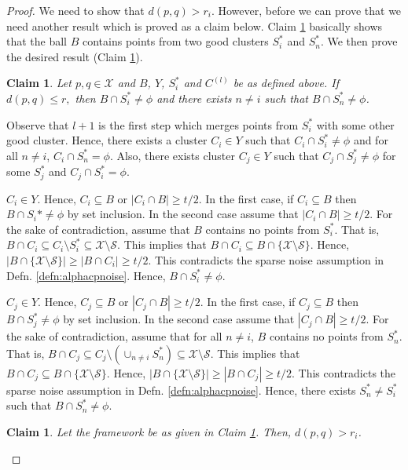 \documentclass[anon,12pt]{colt2016} %
\newtheorem{claim}[theorem]{Claim}
\newcommand{\mc}{\mathcal}
\begin{document}
\begin{proof}
We need to show that $d(p, q) > r_i$. However, before we can prove that we need another result which is proved as a claim below. Claim \ref{claim:fromBothCluster} basically shows that the ball $B$ contains points from two good clusters $S_i^*$ and $S_n^*$. We then prove the desired result (Claim \ref{claim:maxrirj}).
\begin{claim}
\label{claim:fromBothCluster}
Let $p, q \in \mc X$ and $B$, $Y$, $S_i^*$ and $C^{(l)}$ be as defined above. If $d(p, q) \le r,$ then $B \cap S_i^* \neq \phi$ and there exists $n \neq i$ such that $B \cap S_n^* \neq \phi$.
\end{claim}
\vspace{-0.1in} Observe that $l+1$ is the first step which merges points from $S_i^*$ with some other good cluster. Hence, there exists a cluster $C_i \in Y$ such that $C_i\cap S_i^*  \neq \phi$ and for all $n \neq i$, $C_i \cap S_n^* = \phi$. Also, there exists cluster $C_j \in Y$ such that $C_j \cap S_j^* \neq \phi$ for some $S_j^*$ and $C_j \cap S_i^* = \phi$.

$C_i \in Y$. Hence, $C_i \subseteq B$ or $|C_i \cap B| \ge t/2$. In the first case, if $C_i \subseteq B$ then $B \cap S_i* \neq \phi$ by set inclusion. In the second case assume that $|C_i \cap B| \ge t/2$. For the sake of contradiction, assume that $B$ contains no points from $S_i^*$. That is, $B \cap C_i \subseteq C_i \setminus S_i^* \subseteq \mc X \setminus \mc S$. This implies that $B \cap C_i \subseteq B \cap \{\mc X \setminus \mc S\}$. Hence, $|B\cap \{\mc X \setminus \mc S\}| \ge |B \cap C_i| \ge t/2$. This contradicts the sparse noise assumption in Defn. \ref{defn:alphacpnoise}. Hence, $B \cap S_i^* \neq \phi$.

$C_j \in Y$. Hence, $C_j \subseteq B$ or $|C_j \cap B| \ge t/2$. In the first case, if $C_j \subseteq B$ then $B \cap S_j^* \neq \phi$ by set inclusion. In the second case assume that $|C_j \cap B| \ge t/2$. For the sake of contradiction, assume that for all $n \neq i$, $B$ contains no points from $S_n^*$. That is, $B \cap C_j \subseteq C_j \setminus (\cup_{n \neq i} S_n^*) \subseteq \mc X \setminus \mc S$. This implies that $B \cap C_j \subseteq B \cap \{\mc X \setminus \mc S\}$. Hence, $|B\cap \{\mc X \setminus \mc S\}| \ge |B \cap C_j| \ge t/2$. This contradicts the sparse noise assumption in Defn. \ref{defn:alphacpnoise}. Hence, there exists $S_n^* \neq S_i^*$ such that $B \cap S_n^* \neq \phi$.

\begin{claim}
\label{claim:maxrirj}
Let the framework be as given in Claim \ref{claim:fromBothCluster}. Then, $d(p, q) > r_i$.
\end{claim}


\end{proof}
\end{document}

